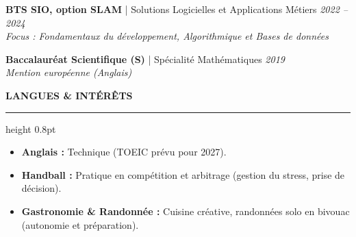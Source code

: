 \documentclass[10pt,a4paper,sans]{article}
\newcommand{\sectiontitle}[1]{%
    \vspace{6pt} %
    {\large\bfseries\color{primary}\uppercase{#1}} %
    \par\vspace{2pt}
    \hrule height 0.8pt
    \par\vspace{5pt} %
}
\newcommand{\experience}[4]{%
    \textbf{#1} | #2 \hfill \textit{#3} \\
    \textit{#4} \vspace{2pt}
}
\begin{document}
\experience{BTS SIO, option SLAM}{Solutions Logicielles et Applications Métiers}{2022 -- 2024}{Focus : Fondamentaux du développement, Algorithmique et Bases de données}

\experience{Baccalauréat Scientifique (S)}{Spécialité Mathématiques}{2019}{Mention européenne (Anglais)}

\sectiontitle{Langues \& Intérêts}
\begin{itemize}[leftmargin=*, label=\textbullet]
    \item \textbf{Anglais :} Technique (TOEIC prévu pour 2027).
    \item \textbf{Handball :} Pratique en compétition et arbitrage (gestion du stress, prise de décision).
    \item \textbf{Gastronomie \& Randonnée :} Cuisine créative, randonnées solo en bivouac (autonomie et préparation).
\end{itemize}
\end{document}
